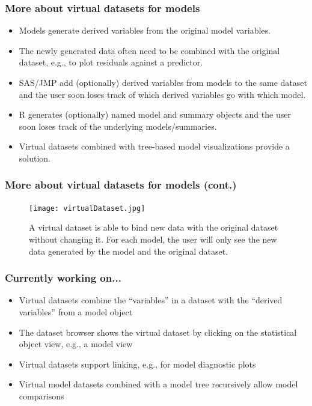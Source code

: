 \documentclass{beamer}
\begin{document}
\begin{frame}
\frametitle{More about virtual datasets for models}
\begin{itemize}
	\item Models generate derived variables from the original model variables.
	\item The newly generated data often need to be combined with the original dataset, e.g., to plot residuals against a predictor.
	\item SAS/JMP add (optionally) derived variables from models to the same dataset and the user soon loses track of which derived variables go with which model.
	\item R generates (optionally) named model and summary objects and the user soon loses track of the underlying models/summaries.
	\item Virtual datasets combined with tree-based model visualizations provide a solution.
\end{itemize}
\end{frame}

\begin{frame}
\frametitle{More about virtual datasets for models (cont.)}
\begin{figure}
\texttt{[image: virtualDataset.jpg]}
\caption{A virtual dataset is able to bind new data with the original dataset without changing it. For each model, the user will only see the new data generated by the model and the original dataset.}
\end{figure}
\end{frame}

\begin{frame}
\frametitle{Currently working on...}
\begin{itemize}
	\item Virtual datasets combine the ``variables'' in a dataset with the ``derived variables'' from a model object
	\item The dataset browser shows the virtual dataset by clicking on the statistical object view, e.g., a model view
	\item Virtual datasets support linking, e.g., for  model diagnostic plots
	\item Virtual model datasets combined with a model tree recursively allow model comparisons 
\end{itemize}
\end{frame}
\end{document}
